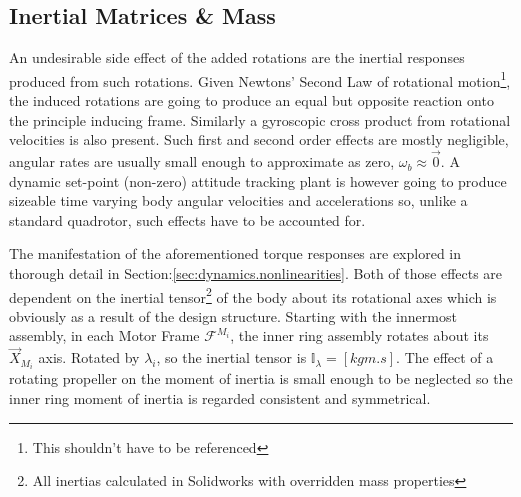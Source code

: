 \subsection{Inertial Matrices \& Mass}
\label{subsec:proto.design.inertia}
An undesirable side effect of the added rotations are the inertial responses produced from such rotations. Given Newtons' Second Law of rotational motion\footnote{This shouldn't have to be referenced}, the induced rotations are going to produce an equal but opposite reaction onto the principle inducing frame. Similarly a gyroscopic cross product from rotational velocities is also present. Such first and second order effects are mostly negligible, angular rates are usually small enough to approximate as zero, $\omega_b\approx\vec{0}$. A dynamic set-point (non-zero) attitude tracking plant is however going to produce sizeable time varying body angular velocities and accelerations so, unlike a standard quadrotor, such effects have to be accounted for.
\par
The manifestation of the aforementioned torque responses are explored in thorough detail in Section:\ref{sec:dynamics.nonlinearities}. Both of those effects are dependent on the inertial tensor\footnote{All inertias calculated in Solidworks with overridden mass properties} of the body about its rotational axes which is obviously as a result of the design structure. Starting with the innermost assembly, in each Motor Frame $\mathcal{F}^{M_i}$, the inner ring assembly rotates about its $\vec{X}_{M_i}$ axis. Rotated by $\lambda_i$, so the inertial tensor is $\mathbb{I}_{\lambda}=[kgm.s]$. The effect of a rotating propeller on the moment of inertia is small enough to be neglected so the inner ring moment of inertia is regarded consistent and symmetrical.
